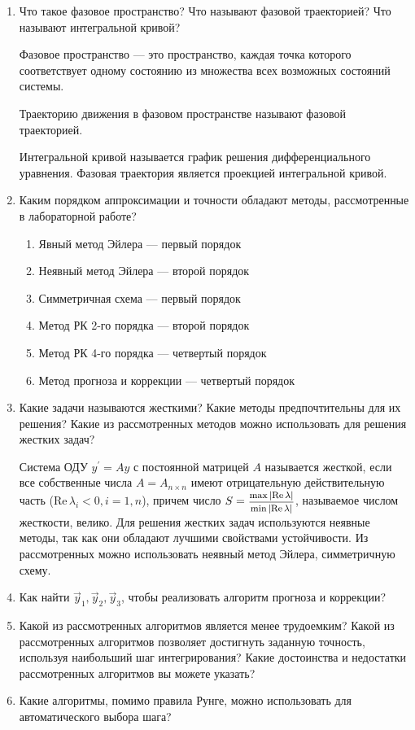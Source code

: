 \documentclass[12pt, a4paper]{article}
\begin{document}
\begin{enumerate}
\item Что такое фазовое пространство? Что называют фазовой траекторией? Что называют интегральной кривой? 

Фазовое пространство --- это пространство, каждая точка которого соответствует одному состоянию из множества всех возможных состояний системы.

Траекторию движения в фазовом пространстве называют фазовой траекторией.

Интегральной кривой называется график решения дифференциального уравнения. Фазовая траектория является проекцией интегральной кривой.

\item Каким порядком аппроксимации и точности обладают методы, рассмотренные в лабораторной работе?
\begin{enumerate}
\item Явный метод Эйлера --- первый порядок 
\item Неявный метод Эйлера --- второй порядок
\item Симметричная схема --- первый порядок
\item Метод РК 2-го порядка --- второй порядок
\item Метод РК 4-го порядка --- четвертый порядок
\item Метод прогноза и коррекции --- четвертый порядок
\end{enumerate}
\item Какие задачи называются жесткими? Какие методы предпочтительны для их решения? Какие из рассмотренных методов можно использовать для решения жестких задач?

Система ОДУ $y^' = Ay$ с постоянной матрицей $A$ называется жесткой, если все собственные числа $A=A_{n\times n}$ имеют отрицательную действительную часть ($\text{Re}\, \lambda_i < 0, i=1,n$), причем число $S = \hbox{\footnotesize$\displaystyle\frac{\max|\text{Re}\, \lambda|}{\min|\text{Re}\, \lambda|}$}$, называемое числом жесткости, велико.
Для решения жестких задач используются неявные методы, так как они обладают лучшими свойствами устойчивости. Из рассмотренных можно использовать неявный метод Эйлера, симметричную схему.

\item Как найти $\vec{y}_1, \vec{y}_2, \vec{y}_3$, чтобы реализовать алгоритм прогноза и коррекции?
\item Какой из рассмотренных алгоритмов является менее трудоемким? Какой из рассмотренных алгоритмов позволяет достигнуть заданную точность, используя наибольший шаг интегрирования? Какие достоинства и недостатки рассмотренных алгоритмов вы можете указать?
\item Какие алгоритмы, помимо правила Рунге, можно использовать для автоматического выбора шага?

\end{enumerate}
\newpage
\end{document}
